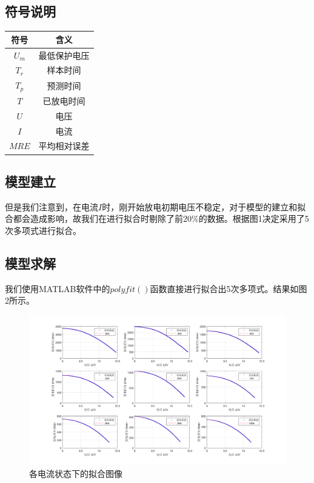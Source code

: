 \documentclass[a4paper]{article}
\begin{document}
\subsection{符号说明}
\begin{table}[htbp]
    \begin{center}
        \setlength\tabcolsep{40pt}
        \renewcommand{\arraystretch}{1.4}
        \begin{tabular}{c c}
            \hline
            符号    & 含义     \\ \hline
            $U_m$ & 最低保护电压 \\
            $T_r$ & 样本时间   \\
            $T_p$ & 预测时间   \\
            $T$   & 已放电时间  \\
            $U$   & 电压     \\
            $I$   & 电流     \\
            $MRE$ & 平均相对误差 \\
            \hline
        \end{tabular}
    \end{center}
\end{table}
\subsection{模型建立}
但是我们注意到，在电流$I$时，刚开始放电初期电压不稳定，对于模型的建立和拟合都会造成影响，故我们在进行拟合时剔除了前$20\%$的数据。根据图1决定采用了5次多项式进行拟合。
\subsection{模型求解}
我们使用MATLAB软件中的$polyfit()$函数直接进行拟合出5次多项式。结果如图2所示。
\begin{figure}[htbp]
    \centering
    \includegraphics[width = 1.0\textwidth]{img/2.png}
    \caption{各电流状态下的拟合图像}
\end{figure}
\end{document}

